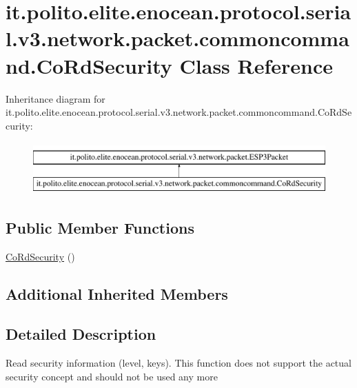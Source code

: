 \hypertarget{classit_1_1polito_1_1elite_1_1enocean_1_1protocol_1_1serial_1_1v3_1_1network_1_1packet_1_1commoncommand_1_1_co_rd_security}{}\section{it.\+polito.\+elite.\+enocean.\+protocol.\+serial.\+v3.\+network.\+packet.\+commoncommand.\+Co\+Rd\+Security Class Reference}
\label{classit_1_1polito_1_1elite_1_1enocean_1_1protocol_1_1serial_1_1v3_1_1network_1_1packet_1_1commoncommand_1_1_co_rd_security}
Inheritance diagram for it.\+polito.\+elite.\+enocean.\+protocol.\+serial.\+v3.\+network.\+packet.\+commoncommand.\+Co\+Rd\+Security\+:\begin{figure}[H]
\begin{center}
\leavevmode
\includegraphics[height=2.000000cm]{classit_1_1polito_1_1elite_1_1enocean_1_1protocol_1_1serial_1_1v3_1_1network_1_1packet_1_1commoncommand_1_1_co_rd_security}
\end{center}
\end{figure}
\subsection*{Public Member Functions}
\begin{DoxyCompactItemize}
\item 
\hyperlink{classit_1_1polito_1_1elite_1_1enocean_1_1protocol_1_1serial_1_1v3_1_1network_1_1packet_1_1commoncommand_1_1_co_rd_security_a09abd70ed63c450515e3e7701c61bf0c}{Co\+Rd\+Security} ()
\end{DoxyCompactItemize}
\subsection*{Additional Inherited Members}


\subsection{Detailed Description}
Read security information (level, keys). This function does not support the actual security concept and should not be used any more

